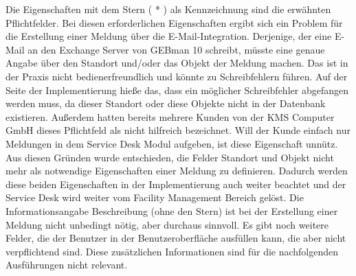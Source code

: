 \noindent
Die Eigenschaften mit dem Stern ( * ) als Kennzeichnung sind die erwähnten Pflichtfelder. Bei diesen erforderlichen Eigenschaften ergibt sich ein Problem für die Erstellung einer Meldung über die E-Mail-Integration. Derjenige, der eine E-Mail an den Exchange Server von GEBman 10 schreibt, müsste eine genaue Angabe über den Standort und/oder das Objekt der Meldung machen. Das ist in der Praxis nicht bedienerfreundlich und könnte zu Schreibfehlern führen. Auf der Seite der Implementierung hieße das, dass ein möglicher Schreibfehler abgefangen werden muss, da dieser Standort oder diese Objekte nicht in der Datenbank existieren. Außerdem hatten bereits mehrere Kunden von der KMS Computer GmbH dieses Pflichtfeld als nicht hilfreich bezeichnet. Will der Kunde einfach nur Meldungen in dem Service Desk Modul aufgeben, ist diese Eigenschaft unnütz. Aus diesen Gründen wurde entschieden, die Felder Standort und Objekt nicht mehr als notwendige Eigenschaften einer Meldung zu definieren. Dadurch werden diese beiden Eigenschaften in der Implementierung auch weiter beachtet und der Service Desk wird weiter vom Facility Management Bereich gelöst. \newline
Die Informationsangabe Beschreibung (ohne den Stern) ist bei der Erstellung einer Meldung nicht unbedingt nötig, aber durchaus sinnvoll. Es gibt noch weitere Felder, die der Benutzer in der Benutzeroberfläche ausfüllen kann, die aber nicht verpflichtend sind. Diese zusätzlichen Informationen sind für die nachfolgenden Ausführungen nicht relevant.

